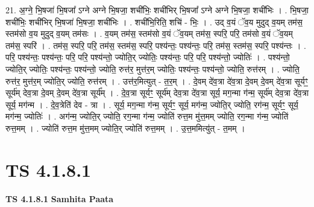 \documentclass[17pt]{extarticle}
\begin{document}
21. अ॒ग्ने॒ भि॒षजा॑ भि॒षजा᳚ ऽग्ने अग्ने भि॒षजा॒ शची॑भिः॒ शची॑भिर् भि॒षजा᳚ ऽग्ने अग्ने भि॒षजा॒ शची॑भिः । . भि॒षजा॒ शची॑भिः॒ शची॑भिर् भि॒षजा॑ भि॒षजा॒ शची॑भिः । . शची॑भि॒रिति॒ शचि॑ - भिः॒ । . उद् व॒यं ॅव॒य मुदुद् व॒यम् तम॑स॒ स्तम॑सो व॒य मुदुद् व॒यम् तम॑सः । . व॒यम् तम॑स॒ स्तम॑सो व॒यं ॅव॒यम् तम॑स॒ स्परि॒ परि॒ तम॑सो व॒यं ॅव॒यम् तम॑स॒ स्परि॑ । . तम॑स॒ स्परि॒ परि॒ तम॑स॒ स्तम॑स॒ स्परि॒ पश्य॑न्तः॒ पश्य॑न्तः॒ परि॒ तम॑स॒ स्तम॑स॒ स्परि॒ पश्य॑न्तः । . परि॒ पश्य॑न्तः॒ पश्य॑न्तः॒ परि॒ परि॒ पश्य॑न्तो॒ ज्योति॒र् ज्योतिः॒ पश्य॑न्तः॒ परि॒ परि॒ पश्य॑न्तो॒ ज्योतिः॑ । . पश्य॑न्तो॒ ज्योति॒र् ज्योतिः॒ पश्य॑न्तः॒ पश्य॑न्तो॒ ज्योति॒ रुत्त॑र॒ मुत्त॑र॒म् ज्योतिः॒ पश्य॑न्तः॒ पश्य॑न्तो॒ ज्योति॒ रुत्त॑रम् । . ज्योति॒ रुत्त॑र॒ मुत्त॑र॒म् ज्योति॒र् ज्योति॒ रुत्त॑रम् । . उत्त॑र॒मित्युत् - त॒र॒म् । . दे॒वम् दे॑व॒त्रा दे॑व॒त्रा दे॒वम् दे॒वम् दे॑व॒त्रा सूर्यꣳ॒॒ सूर्य॑म् देव॒त्रा दे॒वम् दे॒वम् दे॑व॒त्रा सूर्य᳚म् । . दे॒व॒त्रा सूर्यꣳ॒॒ सूर्य॑म् देव॒त्रा दे॑व॒त्रा सूर्य॒ मग॒न्मा ग॑न्म॒ सूर्य॑म् देव॒त्रा दे॑व॒त्रा सूर्य॒ मग॑न्म । . दे॒व॒त्रेति॑ देव - त्रा । . सूर्य॒ मग॒न्मा ग॑न्म॒ सूर्यꣳ॒॒ सूर्य॒ मग॑न्म॒ ज्योति॒र् ज्योति॒ रग॑न्म॒ सूर्यꣳ॒॒ सूर्य॒ मग॑न्म॒ ज्योतिः॑ । . अग॑न्म॒ ज्योति॒र् ज्योति॒ रग॒न्मा ग॑न्म॒ ज्योति॑ रुत्त॒म मु॑त्त॒मम् ज्योति॒ रग॒न्मा ग॑न्म॒ ज्योति॑ रुत्त॒मम् । . ज्योति॑ रुत्त॒म मु॑त्त॒मम् ज्योति॒र् ज्योति॑ रुत्त॒मम् । . उ॒त्त॒ममित्यु॑त् - त॒मम् । \newline
\pagebreak
{}

\section{ TS 4.1.8.1 }

\textbf{TS 4.1.8.1 } \newline
\textbf{Samhita Paata} \newline
\end{document}
